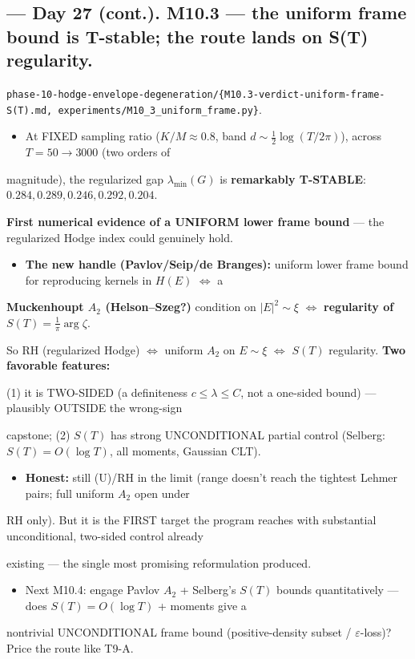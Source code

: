 \documentclass[10pt]{article}
\begin{document}
\subsection*{ --- Day 27 (cont.). M10.3 --- the uniform frame bound is T-stable; the route lands on S(T) regularity.}
\texttt{phase-10-hodge-envelope-degeneration/\{M10.3-verdict-uniform-frame-S(T).md, experiments/M10\_3\_uniform\_frame.py\}}.\par
\begin{itemize}
\item At FIXED sampling ratio ($K/M\approx0.8$, band $d\sim\tfrac12\log(T/2\pi)$), across $T{=}50\to3000$ (two orders of
\end{itemize}
  magnitude), the regularized gap $\lambda_{\min}(G)$ is \textbf{remarkably T-STABLE}: $0.284,0.289,0.246,0.292,0.204$.\par
  \textbf{First numerical evidence of a UNIFORM lower frame bound} --- the regularized Hodge index could genuinely hold.\par
\begin{itemize}
\item \textbf{The new handle (Pavlov/Seip/de Branges):} uniform lower frame bound for reproducing kernels in $H(E)$ $\iff$ a
\end{itemize}
  \textbf{Muckenhoupt $A_2$ (Helson--Szeg?)} condition on $|E|^2\sim\xi$ $\iff$ \textbf{regularity of $S(T)=\tfrac1\pi\arg\zeta$}.\par
  So RH (regularized Hodge) $\iff$ uniform $A_2$ on $E\sim\xi$ $\iff$ $S(T)$ regularity. \textbf{Two favorable features:}\par
  (1) it is TWO-SIDED (a definiteness $c\le\lambda\le C$, not a one-sided bound) --- plausibly OUTSIDE the wrong-sign\par
  capstone; (2) $S(T)$ has strong UNCONDITIONAL partial control (Selberg: $S(T)=O(\log T)$, all moments, Gaussian CLT).\par
\begin{itemize}
\item \textbf{Honest:} still (U)/RH in the limit (range doesn't reach the tightest Lehmer pairs; full uniform $A_2$ open under
\end{itemize}
  RH only). But it is the FIRST target the program reaches with substantial unconditional, two-sided control already\par
  existing --- the single most promising reformulation produced.\par
\begin{itemize}
\item Next M10.4: engage Pavlov $A_2$ + Selberg's $S(T)$ bounds quantitatively --- does $S(T)=O(\log T)$ + moments give a
\end{itemize}
  nontrivial UNCONDITIONAL frame bound (positive-density subset / $\varepsilon$-loss)? Price the route like T9-A.\par
\end{document}
